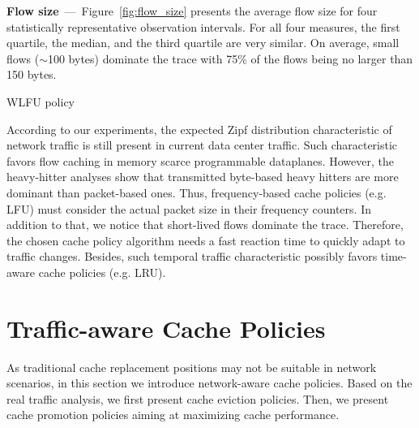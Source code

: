 \textbf{Flow size}~---~Figure~\ref{fig:flow_size} presents the average flow size for four statistically representative observation intervals.
For all four measures, the first quartile, the median, and the third quartile are very similar.
On average, small flows ($\sim$100 bytes) dominate the trace with 75\% of the flows being no larger than 150 bytes.
\begin{algorithm}[t]
	\caption{WLFU policy}
	\label{algo:wlfu}
	\SetInd{0.1em}{.9em}
	\SetAlgoLined
	\footnotesize
\end{algorithm}
According to our experiments, the expected Zipf distribution characteristic of network traffic is still present in current data center traffic.
Such characteristic favors flow caching in memory scarce programmable dataplanes.
However, the heavy-hitter analyses show that transmitted byte-based heavy hitters are more dominant than packet-based ones.
Thus, frequency-based cache policies (e.g. LFU) must consider the actual packet size in their frequency counters.
In addition to that, we notice that short-lived flows dominate the trace.
Therefore, the chosen cache policy algorithm needs a fast reaction time to quickly adapt to traffic changes.
Besides, such temporal traffic characteristic possibly favors time-aware cache policies (e.g. LRU).

\section{Traffic-aware Cache Policies}\label{sec:policies}
As traditional cache replacement positions may not be suitable in network scenarios, in this section we introduce network-aware cache policies.
Based on the real traffic analysis, we first present cache eviction policies.
Then, we present cache promotion policies aiming at maximizing cache performance.

